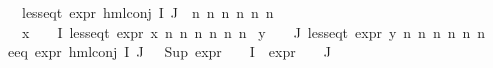 \begin{isabellebody}
\ \ \ {\isachardoublequoteopen}less{\isacharunderscore}{\kern0pt}eq{\isacharunderscore}{\kern0pt}t\ {\isacharparenleft}{\kern0pt}expr\ {\isacharparenleft}{\kern0pt}hml{\isacharunderscore}{\kern0pt}conj\ I\ J\ {\isasymPhi}{\isacharparenright}{\kern0pt}{\isacharparenright}{\kern0pt}\ {\isacharparenleft}{\kern0pt}n{}{\isacharcomma}{\kern0pt}\ n{}{\isacharcomma}{\kern0pt}\ n{}{\isacharcomma}{\kern0pt}\ n{}{\isacharcomma}{\kern0pt}\ n{}{\isacharcomma}{\kern0pt}\ n{}{\isacharparenright}{\kern0pt}{\isachardoublequoteclose}\isanewline
\ \ \ {\isachardoublequoteopen}{\isacharparenleft}{\kern0pt}{\isasymforall}x\ {\isasymin}\ {\isacharparenleft}{\kern0pt}{\isasymPhi}\ {\isacharbackquote}{\kern0pt}\ I{\isacharparenright}{\kern0pt}{\isachardot}{\kern0pt}\ less{\isacharunderscore}{\kern0pt}eq{\isacharunderscore}{\kern0pt}t\ {\isacharparenleft}{\kern0pt}expr\ x{\isacharparenright}{\kern0pt}\ {\isacharparenleft}{\kern0pt}n{}{\isacharcomma}{\kern0pt}\ n{}{\isacharcomma}{\kern0pt}\ n{}{\isacharcomma}{\kern0pt}\ n{}{\isacharcomma}{\kern0pt}\ n{}{\isacharcomma}{\kern0pt}\ n{}{\isacharparenright}{\kern0pt}{\isacharparenright}{\kern0pt}{\isachardoublequoteclose}\ \isanewline
{\isachardoublequoteopen}{\isacharparenleft}{\kern0pt}{\isasymforall}y\ {\isasymin}\ {\isacharparenleft}{\kern0pt}{\isasymPhi}\ {\isacharbackquote}{\kern0pt}\ J{\isacharparenright}{\kern0pt}{\isachardot}{\kern0pt}\ less{\isacharunderscore}{\kern0pt}eq{\isacharunderscore}{\kern0pt}t\ {\isacharparenleft}{\kern0pt}expr\ y{\isacharparenright}{\kern0pt}\ {\isacharparenleft}{\kern0pt}n{}{\isacharcomma}{\kern0pt}\ n{}{\isacharcomma}{\kern0pt}\ n{}{\isacharcomma}{\kern0pt}\ n{}{\isacharcomma}{\kern0pt}\ n{}{\isacharcomma}{\kern0pt}\ n{}{\isacharparenright}{\kern0pt}{\isacharparenright}{\kern0pt}{\isachardoublequoteclose}\isanewline
%
\isadelimproof
%
\endisadelimproof
%
\isatagproof
{}\isamarkupfalse%
{\isacharminus}{\kern0pt}\isanewline
\ \ \isamarkupfalse%
\ e{}{\isacharunderscore}{\kern0pt}eq{\isacharcolon}{\kern0pt}\ {\isachardoublequoteopen}expr{\isacharunderscore}{\kern0pt}{}\ {\isacharparenleft}{\kern0pt}hml{\isacharunderscore}{\kern0pt}conj\ I\ J\ {\isasymPhi}{\isacharparenright}{\kern0pt}\ {\isacharequal}{\kern0pt}\ Sup\ {\isacharparenleft}{\kern0pt}{\isacharparenleft}{\kern0pt}expr{\isacharunderscore}{\kern0pt}{}\ {\isasymcirc}\ {\isasymPhi}{\isacharparenright}{\kern0pt}\ {\isacharbackquote}{\kern0pt}\ I\ {\isasymunion}\ {\isacharparenleft}{\kern0pt}expr{\isacharunderscore}{\kern0pt}{}\ {\isasymcirc}\ {\isasymPhi}{\isacharparenright}{\kern0pt}\ {\isacharbackquote}{\kern0pt}\ J{\isacharparenright}{\kern0pt}{\isachardoublequoteclose}\isanewline

\end{isabellebody}
